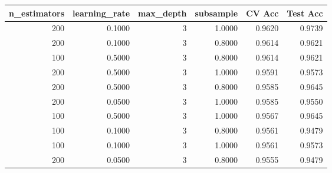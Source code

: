 \begin{tabular}{rrrrrr}
\toprule
n\_estimators & learning\_rate & max\_depth & subsample & CV Acc & Test Acc \\
\midrule
200 & 0.1000 & 3 & 1.0000 & 0.9620 & 0.9739 \\
200 & 0.1000 & 3 & 0.8000 & 0.9614 & 0.9621 \\
100 & 0.5000 & 3 & 0.8000 & 0.9614 & 0.9621 \\
200 & 0.5000 & 3 & 1.0000 & 0.9591 & 0.9573 \\
200 & 0.5000 & 3 & 0.8000 & 0.9585 & 0.9645 \\
200 & 0.0500 & 3 & 1.0000 & 0.9585 & 0.9550 \\
100 & 0.5000 & 3 & 1.0000 & 0.9567 & 0.9645 \\
100 & 0.1000 & 3 & 0.8000 & 0.9561 & 0.9479 \\
100 & 0.1000 & 3 & 1.0000 & 0.9561 & 0.9573 \\
200 & 0.0500 & 3 & 0.8000 & 0.9555 & 0.9479 \\
\bottomrule
\end{tabular}
